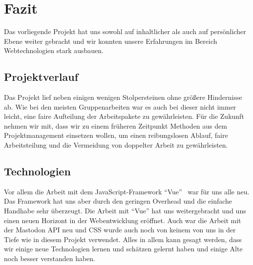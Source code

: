\documentclass[fleqn,10pt]{SelfArx} %
\begin{document}
\section{Fazit}
Das vorliegende Projekt hat uns sowohl auf inhaltlicher als auch auf persönlicher Ebene weiter gebracht und wir konnten unsere Erfahrungen im Bereich Webtechnologien stark ausbauen.
\subsection{Projektverlauf}
Das Projekt lief neben einigen wenigen Stolpersteinen ohne größere Hindernisse ab. Wie bei den meisten Gruppenarbeiten war es auch bei dieser nicht immer leicht, eine faire Aufteilung der Arbeitspakete zu gewährleisten. Für die Zukunft nehmen wir mit, dass wir zu einem früheren Zeitpunkt Methoden aus dem Projektmanagement einsetzen wollen, um einen reibungslosen Ablauf, faire Arbeitsteilung und die Vermeidung von doppelter Arbeit zu gewährleisten.
\subsection{Technologien}
Vor allem die Arbeit mit dem JavaScript-Framework \enquote{Vue}~\cite{vue} war für uns alle neu. Das Framework hat uns aber durch den geringen Overhead und die einfache Handhabe sehr überzeugt. Die Arbeit mit \enquote{Vue} hat uns weitergebracht und uns einen neuen Horizont in der Webentwicklung eröffnet. 
Auch war die Arbeit mit der Mastodon API neu und CSS wurde auch noch von keinem von uns in der Tiefe wie in diesem Projekt verwendet. Alles in allem kann gesagt werden, dass wir einige neue Technologien lernen und schätzen gelernt haben und einige Alte noch besser verstanden haben.
\end{document}
